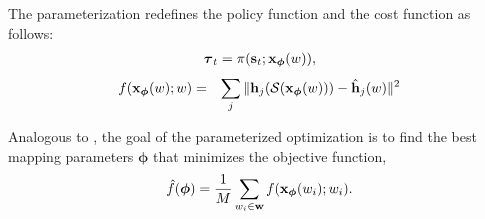 The parameterization redefines the policy function and the cost
function as follows: 
\begin{eqnarray}
  \label{eq:optskills_paramcon}
  \boldsymbol{\tau}_t = \pi(\mathbf{s}_t; \mathbf{x}_{\boldsymbol{\phi}}(w)),
\end{eqnarray}
\begin{eqnarray}
    \label{eq:optskills_paramcost}
    &f(\mathbf{x}_{\boldsymbol{\phi}}(w); w) = 
    &\sum_j \| \mathbf{h}_j(\mathcal{S}(\mathbf{x}_{\boldsymbol{\phi}}(w)))
    - \hat{\mathbf{h}}_{j}(w) \|^2
  \end{eqnarray}

Analogous to , the goal of the
parameterized optimization is to find the best mapping parameters
$\boldsymbol{\phi}$ that minimizes the objective function,
\begin{equation}
  \label{eq:optskills_disccost}
  \hat{f}(\boldsymbol{\phi}) = \frac{1}{M}\sum_{w_i \in \mathbf{w}}
  f(\mathbf{x}_{\boldsymbol{\phi}}(w_i); w_i). 
\end{equation}
